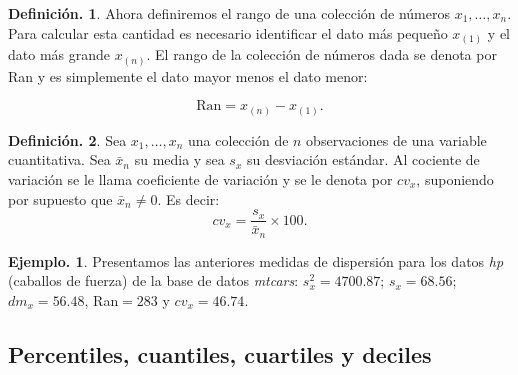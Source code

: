\documentclass[]{book}
\theoremstyle{definition}
\newtheorem{definition}{Definición.}[chapter]
\theoremstyle{definition}
\newtheorem{example}{Ejemplo.}[chapter]
\theoremstyle{definition}
\theoremstyle{remark}
\begin{document}
\begin{definition}
\protect\hypertarget{def:unnamed-chunk-62}{}{\label{def:unnamed-chunk-62} }
Ahora definiremos el rango de una colección de números
\(x_1, \ldots, x_n\). Para
calcular esta cantidad es necesario identificar el dato
más pequeño \(x_{(1)}\) y el
dato más grande \(x_{(n)}\). El rango de la colección de
números dada se denota
por Ran y es simplemente el dato mayor menos el dato
menor:

\[ \mbox{Ran} = x_{(n)} - x_{(1)}.   \]
\end{definition}

\begin{definition}
\protect\hypertarget{def:unnamed-chunk-63}{}{\label{def:unnamed-chunk-63} }
Sea \(x_1, \ldots , x_n\) una colección de \(n\)
observaciones de una variable cuantitativa.
Sea \(\bar{x}_n\) su media y sea \(s_x\) su desviación
estándar. Al cociente de variación se le llama
coeficiente de variación y se le denota por \(cv_x\),
suponiendo por supuesto que \(\bar{x}_n \neq 0\). Es decir:
\[ cv_x = \frac{s_x}{\bar{x}_n} \times 100.\]
\end{definition}

\begin{example}
\protect\hypertarget{exm:unnamed-chunk-64}{}{\label{exm:unnamed-chunk-64} }Presentamos las anteriores medidas de dispersión para
los datos \emph{hp} (caballos de fuerza) de la
base de datos \emph{mtcars}: \(s_x^2 = 4700.87\); \(s_x =68.56\);
\(dm_x= 56.48\), Ran\(= 283\) y \(cv_x= 46.74\).\\
\end{example}

\hypertarget{percentiles-cuantiles-cuartiles-y-deciles}{%
\subsection{Percentiles, cuantiles, cuartiles y deciles}\label{percentiles-cuantiles-cuartiles-y-deciles}}
\end{document}
